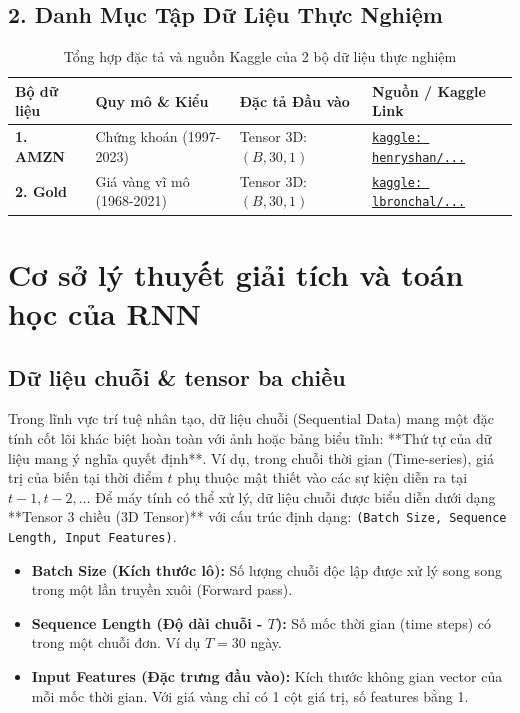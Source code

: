 \documentclass[12pt,a4paper]{article}
\begin{document}
\subsection*{2. Danh Mục Tập Dữ Liệu Thực Nghiệm}
\begin{table}[htbp]
\centering
\small
\begin{tabularx}{\textwidth}{l L{3.2cm} X L{4.2cm}}
\toprule
\textbf{Bộ dữ liệu} & \textbf{Quy mô \& Kiểu} & \textbf{Đặc tả Đầu vào} & \textbf{Nguồn / Kaggle Link} \\
\midrule
\textbf{1. AMZN} & Chứng khoán (1997-2023) & Tensor 3D: $(B, 30, 1)$ & \href{https://www.kaggle.com/datasets/henryshan/amazon-com-inc-amzn}{\texttt{kaggle: henryshan/...}} \\
\addlinespace
\textbf{2. Gold} & Giá vàng vĩ mô (1968-2021) & Tensor 3D: $(B, 30, 1)$ & \href{https://www.kaggle.com/datasets/lbronchal/gold-and-silver-prices-dataset}{\texttt{kaggle: lbronchal/...}} \\
\bottomrule
\end{tabularx}
\caption{Tổng hợp đặc tả và nguồn Kaggle của 2 bộ dữ liệu thực nghiệm}
\label{tab:datasets_spec}
\end{table}

\newpage

\section{Cơ sở lý thuyết giải tích và toán học của RNN}

\subsection{Dữ liệu chuỗi \& tensor ba chiều}
Trong lĩnh vực trí tuệ nhân tạo, dữ liệu chuỗi (Sequential Data) mang một đặc tính cốt lõi khác biệt hoàn toàn với ảnh hoặc bảng biểu tĩnh: **Thứ tự của dữ liệu mang ý nghĩa quyết định**. Ví dụ, trong chuỗi thời gian (Time-series), giá trị của biến tại thời điểm $t$ phụ thuộc mật thiết vào các sự kiện diễn ra tại $t-1, t-2, \dots$
Để máy tính có thể xử lý, dữ liệu chuỗi được biểu diễn dưới dạng **Tensor 3 chiều (3D Tensor)** với cấu trúc định dạng: \texttt{(Batch Size, Sequence Length, Input Features)}.
\begin{itemize}
    \item \textbf{Batch Size (Kích thước lô):} Số lượng chuỗi độc lập được xử lý song song trong một lần truyền xuôi (Forward pass).
    \item \textbf{Sequence Length (Độ dài chuỗi - $T$):} Số mốc thời gian (time steps) có trong một chuỗi đơn. Ví dụ $T=30$ ngày.
    \item \textbf{Input Features (Đặc trưng đầu vào):} Kích thước không gian vector của mỗi mốc thời gian. Với giá vàng chỉ có 1 cột giá trị, số features bằng 1.
\end{itemize}
\end{document}
